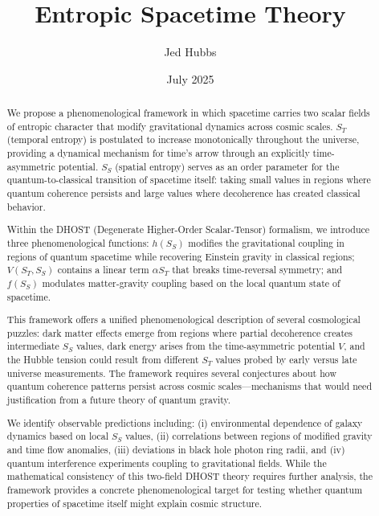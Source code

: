 \documentclass[12pt]{article}
\title{Entropic Spacetime Theory}
\author{Jed Hubbs}
\date{July 2025}
\begin{document}
\maketitle

\begin{abstract}
We propose a phenomenological framework in which spacetime carries two scalar fields of entropic character that modify gravitational dynamics across cosmic scales. $S_T$ (temporal entropy) is postulated to increase monotonically throughout the universe, providing a dynamical mechanism for time's arrow through an explicitly time-asymmetric potential. $S_S$ (spatial entropy) serves as an order parameter for the quantum-to-classical transition of spacetime itself: taking small values in regions where quantum coherence persists and large values where decoherence has created classical behavior.

Within the DHOST (Degenerate Higher-Order Scalar-Tensor) formalism, we introduce three phenomenological functions: $h(S_S)$ modifies the gravitational coupling in regions of quantum spacetime while recovering Einstein gravity in classical regions; $V(S_T, S_S)$ contains a linear term $\alpha S_T$ that breaks time-reversal symmetry; and $f(S_S)$ modulates matter-gravity coupling based on the local quantum state of spacetime.

This framework offers a unified phenomenological description of several cosmological puzzles: dark matter effects emerge from regions where partial decoherence creates intermediate $S_S$ values, dark energy arises from the time-asymmetric potential $V$, and the Hubble tension could result from different $S_T$ values probed by early versus late universe measurements. The framework requires several conjectures about how quantum coherence patterns persist across cosmic scales---mechanisms that would need justification from a future theory of quantum gravity.

We identify observable predictions including: (i) environmental dependence of galaxy dynamics based on local $S_S$ values, (ii) correlations between regions of modified gravity and time flow anomalies, (iii) deviations in black hole photon ring radii, and (iv) quantum interference experiments coupling to gravitational fields. While the mathematical consistency of this two-field DHOST theory requires further analysis, the framework provides a concrete phenomenological target for testing whether quantum properties of spacetime itself might explain cosmic structure.
\end{abstract}
\end{document}
